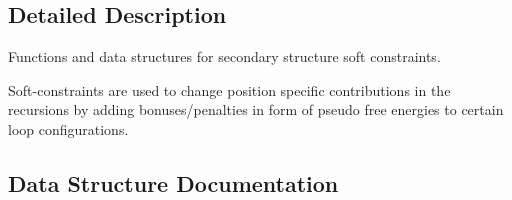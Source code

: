 \subsection{Detailed Description}
Functions and data structures for secondary structure soft constraints. 

Soft-\/constraints are used to change position specific contributions in the recursions by adding bonuses/penalties in form of pseudo free energies to certain loop configurations. 

\subsection{Data Structure Documentation}
\label{structvrna__sc__s}
\hypertarget{group__soft__constraints_structvrna__sc__s}{}
